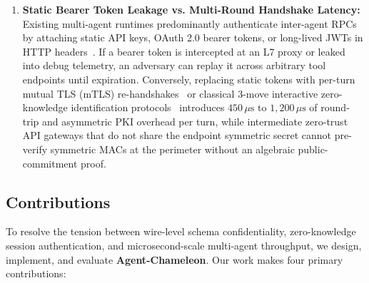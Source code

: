 \documentclass[conference,10pt]{IEEEtran}
\begin{document}
\begin{enumerate}
    \item \textbf{Static Bearer Token Leakage vs. Multi-Round Handshake Latency:} Existing multi-agent runtimes predominantly authenticate inter-agent RPCs by attaching static API keys, OAuth 2.0 bearer tokens, or long-lived JWTs in HTTP headers~\cite{fett2023dpop, backman2024rfc9421, birgisson2014macaroons, schinazi2025rfc9729}. If a bearer token is intercepted at an L7 proxy or leaked into debug telemetry, an adversary can replay it across arbitrary tool endpoints until expiration. Conversely, replacing static tokens with per-turn mutual TLS (mTLS) re-handshakes~\cite{rescorla2018tls13} or classical 3-move interactive zero-knowledge identification protocols~\cite{goldwasser1989knowledge, schnorr1991efficient} introduces $450\,\mu\text{s}$ to $1{,}200\,\mu\text{s}$ of round-trip and asymmetric PKI overhead per turn, while intermediate zero-trust API gateways that do not share the endpoint symmetric secret cannot pre-verify symmetric MACs at the perimeter without an algebraic public-commitment proof.
\end{enumerate}

\subsection{Contributions}
To resolve the tension between wire-level schema confidentiality, zero-knowledge session authentication, and microsecond-scale multi-agent throughput, we design, implement, and evaluate \textbf{Agent-Chameleon}. Our work makes four primary contributions:
\end{document}
